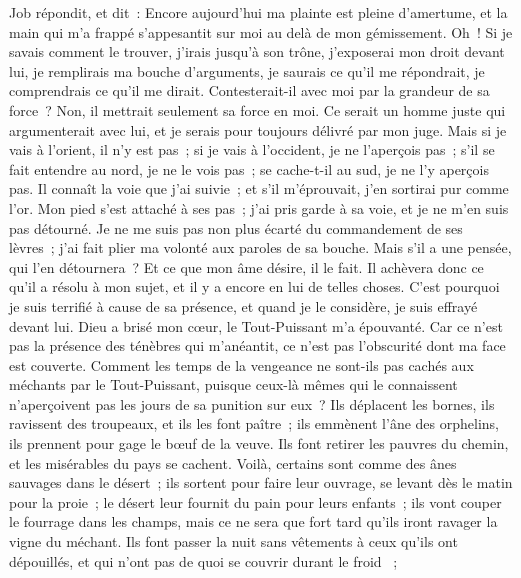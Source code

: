 \begin{multicols}{2}
\VerseOne{}Job répondit, et dit~:
Encore aujourd'hui ma plainte est pleine d'amertume, et la main qui m'a frappé s'appesantit sur moi au delà de mon gémissement.
Oh~! Si je savais comment le trouver, j'irais jusqu'à son trône,
j'exposerai mon droit devant lui, je remplirais ma bouche d'arguments,
je saurais ce qu'il me répondrait, je comprendrais ce qu'il me dirait.
Contesterait-il avec moi par la grandeur de sa force~? Non, il mettrait seulement sa force en moi. 
Ce serait un homme juste qui argumenterait avec lui, et je serais pour toujours délivré par mon juge.
Mais si je vais à l'orient, il n'y est pas~; si je vais à l'occident, je ne l'aperçois pas~;
s'il se fait entendre au nord, je ne le vois pas~; se cache-t-il au sud, je ne l'y aperçois pas.
Il connaît la voie que j'ai suivie~; et s'il m'éprouvait, j'en sortirai pur comme l'or.
Mon pied s'est attaché à ses pas~; j'ai pris garde à sa voie, et je ne m'en suis pas détourné.
Je ne me suis pas non plus écarté du commandement de ses lèvres~; j'ai fait plier ma volonté aux paroles de sa bouche.
Mais s'il a une pensée, qui l'en détournera~? Et ce que mon âme désire, il le fait.
Il achèvera donc ce qu'il a résolu à mon sujet, et il y a encore en lui de telles choses.
C'est pourquoi je suis terrifié à cause de sa présence, et quand je le considère, je suis effrayé devant lui.
Dieu a brisé mon cœur, le Tout-Puissant m'a épouvanté.
Car ce n'est pas la présence des ténèbres qui m'anéantit, ce n'est pas l'obscurité dont ma face est couverte.
\VerseOne{}Comment les temps de la vengeance ne sont-ils pas cachés aux méchants par le Tout-Puissant, puisque ceux-là mêmes qui le connaissent n'aperçoivent pas les jours de sa punition sur eux~?
Ils déplacent les bornes, ils ravissent des troupeaux, et ils les font paître~;
ils emmènent l'âne des orphelins, ils prennent pour gage le bœuf de la veuve.
Ils font retirer les pauvres du chemin, et les misérables du pays se cachent.
Voilà, certains sont comme des ânes sauvages dans le désert~; ils sortent pour faire leur ouvrage, se levant dès le matin pour la proie~; le désert leur fournit du pain pour leurs enfants~;
ils vont couper le fourrage dans les champs, mais ce ne sera que fort tard qu'ils iront ravager la vigne du méchant. 
Ils font passer la nuit sans vêtements à ceux qu'ils ont dépouillés, et qui n'ont pas de quoi se couvrir durant le froid ~;

\end{multicols}

